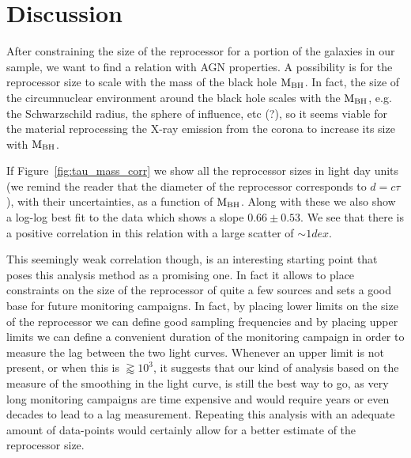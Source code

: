 \section{Discussion}
After constraining the size of the reprocessor for a portion of the galaxies in our sample, we want to find a relation with AGN properties. 
A possibility is for the reprocessor size to scale with the mass of the black hole ${\rm M}_{\rm BH}$. In fact, the size of the circumnuclear environment around the black hole scales with the ${\rm M}_{\rm BH}$, e.g. the Schwarzschild radius, the sphere of influence, etc (?), so it seems viable for the material reprocessing the X-ray emission from the corona to increase its size with ${\rm M}_{\rm BH}$.

If Figure~\ref{fig:tau_mass_corr} we show all the reprocessor sizes in light day units (we remind the reader that the diameter of the reprocessor corresponds to $d=c\tau$), with their uncertainties, as a function of ${\rm M}_{\rm BH}$. Along with these we also show a log-log best fit to the data which shows a slope $0.66\pm0.53$. We see that there is a positive correlation in this relation with a large scatter of $\sim1 dex$.

This seemingly weak correlation though, is an interesting starting point that poses this analysis method as a promising one. In fact it allows to place constraints on the size of the reprocessor of quite a few sources and sets a good base for future monitoring campaigns. In fact, by placing lower limits on the size of the reprocessor we can define good sampling frequencies and by placing upper limits we can define a convenient duration of the monitoring campaign in order to measure the lag between the two light curves. 
Whenever an upper limit is not present, or when this is $\gtrapprox10^3$, it suggests that our kind of analysis based on the measure of the smoothing in the \kalfa{} light curve, is still the best way to go, as very long monitoring campaigns are time expensive and would require years or even decades to lead to a lag measurement. Repeating this analysis with an adequate amount of data-points would certainly allow for a better estimate of the reprocessor size.


